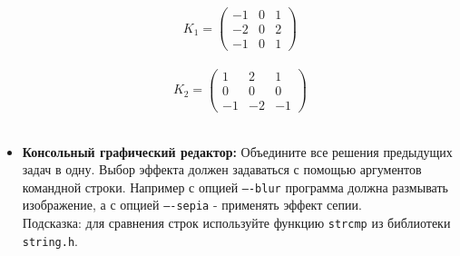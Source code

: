 \documentclass{article}
\begin{document}
\begin{itemize}
\begin{multicols}{2}
$$
K_1 = 
\begin{pmatrix}
-1 & 0 & 1 \\
-2 & 0 & 2 \\
-1 & 0 & 1
\end{pmatrix}
$$\\
\vfill
$$
K_2 = 
\begin{pmatrix}
1 & 2 & 1 \\
0 & 0 & 0 \\
-1 & -2 & -1
\end{pmatrix}
$$\\
\end{multicols}
\item \textbf{Консольный графический редактор:} Объедините все решения предыдущих задач в одну. Выбор эффекта должен задаваться с помощью аргументов командной строки. Например с опцией \texttt{----blur} программа должна размывать изображение, а с опцией \texttt{----sepia} - применять эффект сепии. \\
Подсказка: для сравнения строк используйте функцию \texttt{strcmp} из библиотеки \texttt{string.h}.

\end{itemize}
\end{document}
